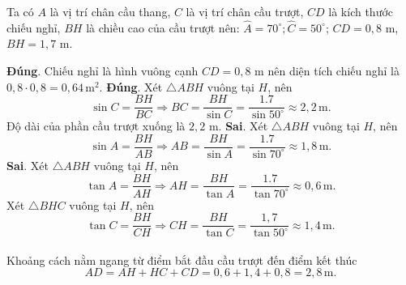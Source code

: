 \begin{ex}
{\begin{center}
\begin{tikzpicture}
	\end{tikzpicture}
	\end{center}
	Ta có $A$ là vị trí chân cầu thang, $C$ là vị trí chân cầu trượt, $CD$ là kích thước chiếu nghỉ, $BH$ là chiều cao của cầu trượt nên: $\widehat{A} = 70^\circ; \widehat{C} = 50^\circ$; $CD = 0{,}8$ m, $BH = 1{,}7$ m.
	\begin{itemchoice}
	\itemch \textbf{Đúng}. Chiếu nghỉ là hình vuông cạnh $CD = 0{,}8$ m nên diện tích chiếu nghỉ là $0{,}8 \cdot 0{,}8 = 0{,}64\,\mathrm{m}^2$.
	\itemch \textbf{Đúng}. Xét $\triangle ABH$ vuông tại $H$, nên
	$$\sin C = \dfrac{BH}{BC} \Rightarrow BC = \dfrac{BH}{\sin C} = \dfrac{1.7}{\sin 50^\circ} \approx 2{,}2\,\mathrm{m}.$$
	Độ dài của phần cầu trượt xuống là $2{,}2$ m.
	\itemch \textbf{Sai}. Xét $\triangle ABH$ vuông tại $H$, nên
	$$\sin A = \dfrac{BH}{AB} \Rightarrow AB = \dfrac{BH}{\sin A} = \dfrac{1.7}{\sin 70^\circ} \approx 1{,}8\,\mathrm{m}.$$
	\itemch \textbf{Sai}. Xét $\triangle ABH$ vuông tại $H$, nên
	$$\tan A = \dfrac{BH}{AH} \Rightarrow AH = \dfrac{BH}{\tan A} = \dfrac{1.7}{\tan 70^\circ} \approx 0{,}6\,\mathrm{m}.$$
	Xét $\triangle BHC$ vuông tại $H$, nên
	$$\tan C = \dfrac{BH}{CH} \Rightarrow CH = \dfrac{BH}{\tan C} = \dfrac{1{,}7}{\tan 50^\circ} \approx 1{,}4\,\mathrm{m}.$$\\
	Khoảng cách nằm ngang từ điểm bắt đầu cầu trượt đến điểm kết thúc
	$$AD = AH + HC + CD = 0{,}6 + 1{,}4 + 0{,}8 = 2{,}8\,\mathrm{m}.$$
	\end{itemchoice}
	}
\end{ex}
